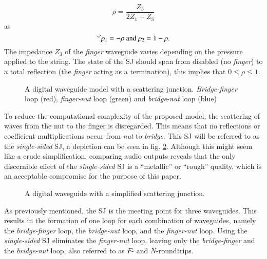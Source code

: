 \documentclass{sigchi}
\begin{document}
\begin{equation} \label{eq:rho}
	\rho=\frac{Z_3}{2Z_1+Z_3}
\end{equation}
as
\begin{equation}`'
	\rho_1=-\rho \text{ and } \rho_2=1-\rho.
\end{equation}
The impedance $Z_3$ of the \textit{finger} waveguide varies depending on the pressure applied to the string.
The state of the SJ should span from disabled (no \textit{finger}) to a total reflection (the \textit{finger} acting as a termination), this implies that $0 \leq \rho \leq 1$.

\begin{figure}[h]
	\centering
	\scalebox{0.56}{}
	\caption{A digital waveguide model with a scattering junction.
		\textit{Bridge-finger} loop (red), \textit{finger-nut} loop (green) and \textit{bridge-nut} loop (blue)}
	\label{fig:waveguide_sj}
\end{figure}

To reduce the computational complexity of the proposed model, the scattering of waves from the nut to the finger is disregarded.
This means that no reflections or coefficient multiplications occur from \textit{nut} to \textit{bridge}.
This SJ will be referred to as the \textit{single-sided} SJ, a depiction can be seen in fig. \ref{fig:waveguide_simple_sj}.
Although this might seem like a crude simplification, comparing audio outputs reveals that the only discernible effect of the \textit{single-sided} SJ is a ``metallic'' or ``rough'' quality, which is an acceptable compromise for the purpose of this paper.
\begin{figure}[h]
	\centering
	\scalebox{0.6}{}
	\caption{A digital waveguide with a simplified scattering junction.}
	\label{fig:waveguide_simple_sj}
\end{figure}

As previously mentioned, the SJ is the meeting point for three waveguides.
This results in the formation of one loop for each combination of waveguides, namely the \textit{bridge-finger} loop, the \textit{bridge-nut} loop, and the \textit{finger-nut} loop.
Using the \textit{single-sided} SJ eliminates the \textit{finger-nut} loop, leaving only the \textit{bridge-finger} and the \textit{bridge-nut} loop, also referred to as $F$- and $N$-roundtrips.
\end{document}
